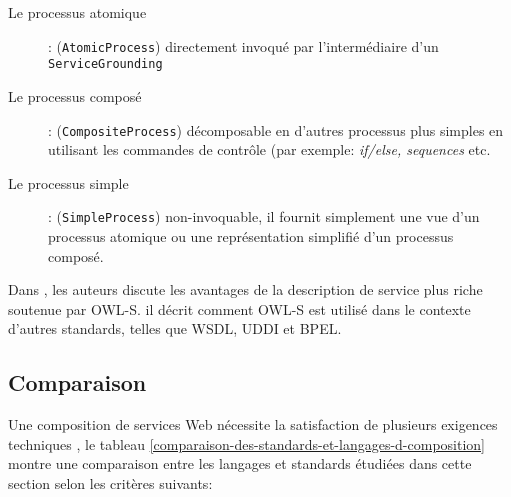   \renewcommand{\descriptionlabel}[1]{\hspace{0.5cm}\textbullet~\textsf{#1}}
  \begin{description}
  \item[Le processus atomique]: (\verb|AtomicProcess|) directement
    invoqué par l'intermédiaire d'un \verb|ServiceGrounding|

  \item[Le processus composé]: (\verb|CompositeProcess|) décomposable
    en d'autres processus plus simples en utilisant les commandes de
    contrôle (par exemple: \textit{if/else, sequences} etc.

  \item[Le processus simple]: (\verb|SimpleProcess|) non-invoquable,
    il fournit simplement une vue d'un processus atomique ou une
    représentation simplifié d’un processus composé.
  \end{description}
  \enddescription

  Dans \cite{martin2004owl}, les auteurs discute les avantages de la
  description de service plus riche soutenue par \textsc{OWL-S}. il
  décrit comment \textsc{OWL-S} est utilisé dans le contexte d'autres
  standards, telles que \textsc{WSDL}, \textsc{UDDI} et \textsc{BPEL}.

  \subsection{Comparaison}
  \label{sec:langs-comparaison}
  Une composition de services Web nécessite la satisfaction de
  plusieurs exigences techniques \cite{sheng2014web,
    bucchiarone2006survey} , le tableau
  \ref{comparaison-des-standards-et-langages-d-composition} montre une
  comparaison entre les langages et standards étudiées dans cette
  section selon les critères suivants:

  

